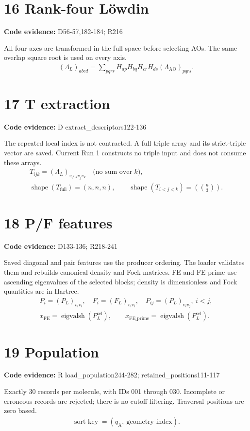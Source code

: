 \documentclass[10pt,a4paper]{article}
\newcommand{\stage}[2]{\section*{#1}\textbf{Code evidence:} #2\par}
\begin{document}
\par\noindent\begin{minipage}{\linewidth}
\stage{16 Rank-four Löwdin}{D56-57,182-184; R216}
All four axes are transformed in the full space before selecting AOs. The same overlap square root is used on every axis.
\[
\begin{gathered}
(\Lambda_L)_{abcd}=\sum_{pqrs}H_{ap}H_{bq}H_{cr}H_{ds}(\Lambda_{\mathrm{AO}})_{pqrs}.
\end{gathered}
\]
\end{minipage}\par\vspace{4pt}
\par\noindent\begin{minipage}{\linewidth}
\stage{17 T extraction}{D extract\_descriptors122-136}
The repeated local index is not contracted. A full triple array and its strict-triple vector are saved. Current Run 1 constructs no triple input and does not consume these arrays.
\[
\begin{gathered}
T_{ijk}=(\Lambda_L)_{v_i v_k v_j v_k}\quad\text{(no sum over }k\text{)},\\ \operatorname{shape}(T_{\mathrm{full}})=(n,n,n),\qquad \operatorname{shape}(T_{i<j<k})=\left(\binom n3\right).
\end{gathered}
\]
\end{minipage}\par\vspace{4pt}
\par\noindent\begin{minipage}{\linewidth}
\stage{18 P/F features}{D133-136; R218-241}
Saved diagonal and pair features use the producer ordering. The loader validates them and rebuilds canonical density and Fock matrices. FE and FE-prime use ascending eigenvalues of the selected blocks; density is dimensionless and Fock quantities are in Hartree.
\[
\begin{gathered}
P_i=(P_L)_{v_i v_i},\quad F_i=(F_L)_{v_i v_i},\quad P_{ij}=(P_L)_{v_i v_j},\ i<j,\\ x_{\mathrm{FE}}=\operatorname{eigvalsh}(P_L^{\mathrm{sel}}),\qquad x_{\mathrm{FE\_prime}}=\operatorname{eigvalsh}(F_L^{\mathrm{sel}}).
\end{gathered}
\]
\end{minipage}\par\vspace{4pt}
\par\noindent\begin{minipage}{\linewidth}
\stage{19 Population}{R load\_population244-282; retained\_positions111-117}
Exactly 30 records per molecule, with IDs 001 through 030. Incomplete or erroneous records are rejected; there is no cutoff filtering. Traversal positions are zero based.
\[
\begin{gathered}
\operatorname{sort\ key}=(q_{\mathrm{A}},\ \text{geometry index}).
\end{gathered}
\]
\end{minipage}\par\vspace{4pt}
\end{document}
